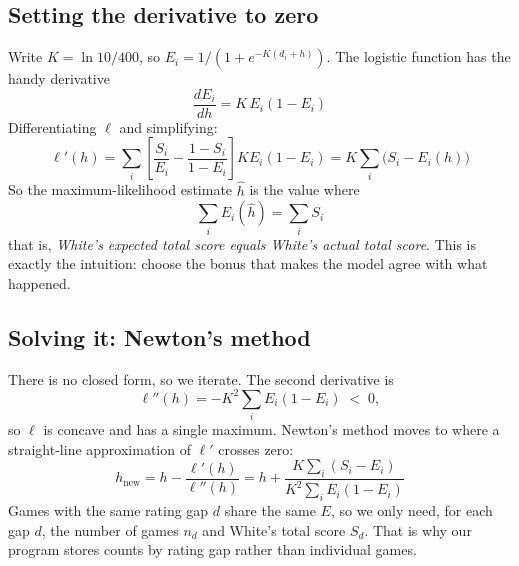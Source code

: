 \documentclass[11pt,a4paper]{article}
\begin{document}
\subsection{Setting the derivative to zero}
Write $K = \ln 10 / 400$, so $E_i = 1/(1 + e^{-K(d_i + h)})$. The logistic function has the
handy derivative
\[
\frac{dE_i}{dh} = K\, E_i (1 - E_i)
\]
Differentiating $\ell$ and simplifying:
\[
\ell'(h) = \sum_i \left[ \frac{S_i}{E_i} - \frac{1 - S_i}{1 - E_i} \right] K E_i (1 - E_i)
         = K \sum_i \big( S_i - E_i(h) \big)
\]
So the maximum-likelihood estimate $\hat h$ is the value where
\[
\boxed{\ \sum_i E_i(\hat h) = \sum_i S_i\ }
\]
that is, \emph{White's expected total score equals White's actual total score}. This is
exactly the intuition: choose the bonus that makes the model agree with what happened.

\subsection{Solving it: Newton's method}
There is no closed form, so we iterate. The second derivative is
\[
\ell''(h) = -K^2 \sum_i E_i (1 - E_i) \;<\; 0,
\]
so $\ell$ is concave and has a single maximum. Newton's method moves to where a straight-line
approximation of $\ell'$ crosses zero:
\[
h_{\text{new}} = h - \frac{\ell'(h)}{\ell''(h)}
= h + \frac{K \sum_i (S_i - E_i)}{K^2 \sum_i E_i (1 - E_i)}
\]
Games with the same rating gap $d$ share the same $E$, so we only need, for each gap $d$, the
number of games $n_d$ and White's total score $S_d$. That is why our program stores counts by
rating gap rather than individual games.
\end{document}

